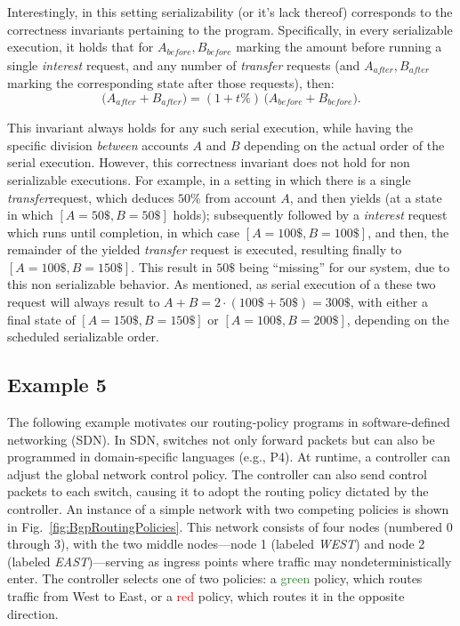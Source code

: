 Interestingly, in this setting serializability (or it's lack thereof) corresponds to the correctness invariants pertaining to the program. Specifically, in every serializable execution, it holds that for $A_{\textit{before}},B_{\textit{before}}$ marking the amount before running a single \textit{interest} request, and any number of \textit{transfer} requests (and $A_{\textit{after}},B_{\textit{after}}$ marking the corresponding state after those requests), then:
\[
\bigl(A_{\mathit{after}} + B_{\mathit{after}}\bigr)
= (1 + t\%)\,\bigl(A_{\mathit{before}} + B_{\mathit{before}}\bigr).
\]

This invariant always holds for any such serial execution, while having the specific division \textit{between} accounts $A$ and $B$ depending on the actual order of the serial execution.
%
However, this correctness invariant does not hold for non serializable executions. For example, in a setting in which there is a single \textit{transfer}request, which deduces $50\%$ from account $A$, and then yields (at a state in which $[A=50\$,B=50\$]$ holds); subsequently followed by a  \textit{interest} request which runs until completion, in which case  $[A=100\$,B=100\$]$, and then, the remainder of the yielded \textit{transfer} request is executed, resulting finally to $[A=100\$, B=150\$]$.  This result in $50\$$ being ``missing'' for our system, due to this non serializable behavior.
%
As mentioned, as serial execution of a these two request will always result to 
$A+B=2\cdot (100\$+50\$)=300\$$, with either a final state of $[A=150\$, B=150\$]$ or $[A=100\$, B=200\$]$, depending on the scheduled serializable order.




\subsection{Example 5}

The following example motivates our routing‐policy programs in software‐defined networking (SDN). In SDN, switches not only forward packets but can also be programmed in domain‐specific languages (e.g., P4). At runtime, a controller can adjust the global network control policy. The controller can also send control packets to each switch, causing it to adopt the routing policy dictated by the controller.
%
An instance of a simple network with two competing policies is shown in Fig.~\ref{fig:BgpRoutingPolicies}. This network consists of four nodes (numbered 0 through 3), with the two middle nodes—node 1 (labeled \textit{WEST}) and node 2 (labeled \textit{EAST})—serving as ingress points where traffic may nondeterministically enter. The controller selects one of two policies: a \textcolor{ForestGreen}{green} policy, which routes traffic from West to East, or a \textcolor{red}{red} policy, which routes it in the opposite direction.



